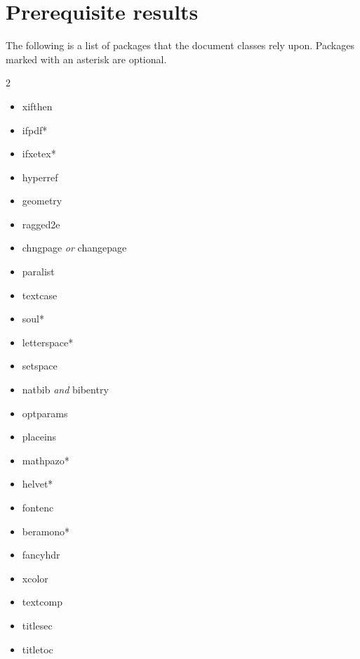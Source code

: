 \chapter{Prerequisite results}
\label{ch:appendix:prerequisite-results}

\begingroup\sloppy
\label{template:sec:dependencies}
The following is a list of packages that the \TL document
classes rely upon.  Packages marked with an asterisk are optional.
\begin{multicols}{2}
\begin{itemize}
  \item xifthen
  \item ifpdf*
  \item ifxetex*
  \item hyperref
  \item geometry
  \item ragged2e
  \item chngpage \emph{or} changepage
  \item paralist
  \item textcase
  \item soul*
  \item letterspace*
  \item setspace
  \item natbib \emph{and} bibentry
  \item optparams
  \item placeins
  \item mathpazo*
  \item helvet*
  \item fontenc
  \item beramono*
  \item fancyhdr
  \item xcolor
  \item textcomp
  \item titlesec
  \item titletoc
\end{itemize}
\end{multicols}

\lipsum[2]
\par\endgroup

